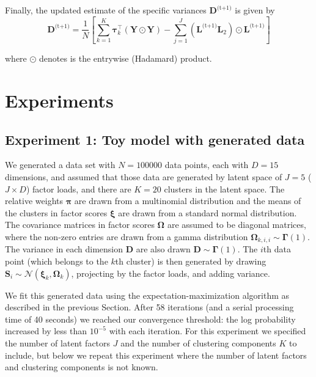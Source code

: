 \documentclass[twocolumn]{aastex61}
\newcommand{\vect}[1]{\boldsymbol{\mathbf{#1}}}
\renewcommand{\vec}[1]{\vect{#1}}
\newcommand{\weight}{\pi}
\newcommand{\data}{\textbf{Y}}
\newcommand{\vecdata}{\vec\data}
\newcommand{\nextstep}{^\textrm{(t+1)}}
\newcommand{\transpose}{^\intercal}
\newcommand{\factorloads}{\textbf{L}}
\newcommand{\factorscores}{\textbf{S}}
\newcommand{\specificvariance}{\vec{D}}
\newcommand{\scoremeans}{\vec\xi}
\newcommand{\scorecovs}{\vec\Omega}
\begin{document}
Finally, the updated estimate of the specific variances $\specificvariance\nextstep$ is given
by
\begin{equation}
	\specificvariance\nextstep = \frac{1}{N}\left[\sum^{K}_{k=1}\vec\tau_k\transpose\left(\vecdata\odot\vecdata\right) - \sum_{j=1}^{J}\left(\factorloads\nextstep\factorloads_2\right)\odot\factorloads\nextstep\right]
\end{equation}

\noindent{}where $\odot$ denotes is the entrywise (Hadamard) product.


\section{Experiments} \label{sec:experiments}

\subsection{Experiment 1: Toy model with generated data} \label{sec:experiment-toy-model}

We generated a data set with ${N = 100000}$ data points, each with
$D = 15$ dimensions, and assumed that those data are generated by
latent space of $J = 5$ ($J \times D$) factor loads, and there are $K = 20$
clusters in the latent space. The relative weights $\vec\weight$
are drawn from a multinomial distribution and the means of the clusters
in factor scores $\scoremeans$ are drawn from a standard normal
distribution. The covariance matrices in factor scores $\scorecovs$ are assumed to be diagonal matrices, where the non-zero entries are drawn from a gamma distribution $\scorecovs_{k,i,i} \sim \vec\Gamma\left(1\right)$. The variance in 
each dimension $\specificvariance$ are also drawn $\specificvariance \sim \vec\Gamma\left(1\right)$.
The $i$th data point (which belongs to the $k$th cluster) is then
generated by drawing $\factorscores_{i} \sim \mathcal{N}(\scoremeans_k,\scorecovs_k)$, projecting by the factor loads, and adding variance.

We fit this generated data using the expectation-maximization algorithm
as described in the previous Section. After 58 iterations
(and a serial processing time of 40 seconds) we
reached our convergence threshold: the log probability increased by
less than $10^{-5}$ with each iteration. For this experiment we specified
the number of latent factors $J$ and the number of clustering components
$K$ to include, but below we repeat this experiment where the number
of latent factors and clustering components is not known.
\end{document}
